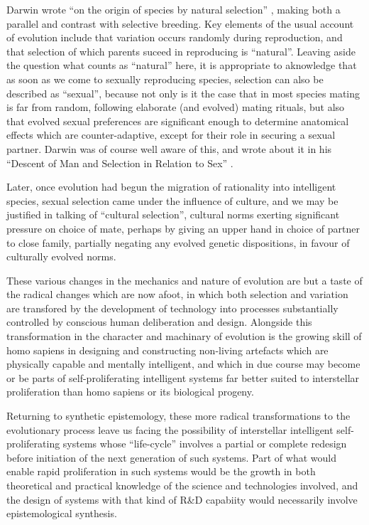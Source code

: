 Darwin wrote ``on the origin of species by natural selection'' \cite{darwin-oos}, making both a parallel and contrast with selective breeding.
Key elements of the usual account of evolution include that variation occurs randomly during reproduction, and that selection of which parents suceed in reproducing is ``natural''.
Leaving aside the question what counts as ``natural'' here, it is appropriate to aknowledge that as soon as we come to sexually reproducing species, selection can also be described as ``sexual'', because not only is it the case that in most species mating is far from random, following elaborate (and evolved) mating rituals, but also that evolved sexual preferences are significant enough to determine anatomical effects which are counter-adaptive, except for their role in securing a sexual partner.
Darwin was of course well aware of this, and wrote about it in his ``Descent of Man and Selection in Relation to Sex'' \cite{darwin1890descent}.

Later, once evolution had begun the migration of rationality into intelligent species, sexual selection came under the influence of culture, and we may be justified in talking of ``cultural selection'', cultural norms exerting significant pressure on choice of mate, perhaps by giving an upper hand in choice of partner to close family, partially negating any evolved genetic dispositions, in favour of culturally evolved norms.

These various changes in the mechanics and nature of evolution are but a taste of the radical changes which are now afoot, in which both selection and variation are transfored by the development of technology into processes substantially controlled by conscious human deliberation and design.
Alongside this transformation in the character and machinary of evolution is the growing skill of homo sapiens in designing and constructing non-living artefacts which are physically capable and mentally intelligent, and which in due course may become or be parts of self-proliferating intelligent systems far better suited to interstellar proliferation than homo sapiens or its biological progeny.

Returning to synthetic epistemology, these more radical transformations to the evolutionary process leave us facing the possibility of interstellar intelligent self-proliferating systems whose ``life-cycle'' involves a partial or complete redesign before initiation of the next generation of such systems.
Part of what would enable rapid proliferation in such systems would be the growth in both theoretical and practical knowledge of the science and technologies involved, and the design of systems with that kind of R\&D capabiity would necessarily involve epistemological synthesis.

